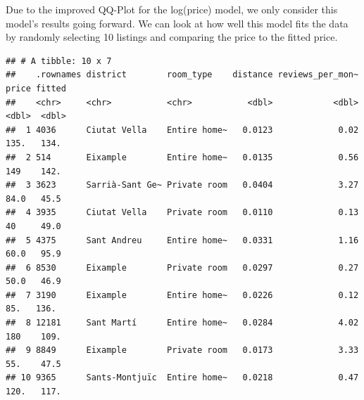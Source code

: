 \documentclass[]{article}
\newenvironment{Shaded}{\begin{snugshade}}{\end{snugshade}}
\newcommand{\DataTypeTok}[1]{\textcolor[rgb]{0.13,0.29,0.53}{#1}}
\newcommand{\DecValTok}[1]{\textcolor[rgb]{0.00,0.00,0.81}{#1}}
\newcommand{\FloatTok}[1]{\textcolor[rgb]{0.00,0.00,0.81}{#1}}
\newcommand{\KeywordTok}[1]{\textcolor[rgb]{0.13,0.29,0.53}{\textbf{#1}}}
\newcommand{\NormalTok}[1]{#1}
\newcommand{\OperatorTok}[1]{\textcolor[rgb]{0.81,0.36,0.00}{\textbf{#1}}}
\newcommand{\OtherTok}[1]{\textcolor[rgb]{0.56,0.35,0.01}{#1}}
\newcommand{\StringTok}[1]{\textcolor[rgb]{0.31,0.60,0.02}{#1}}
\begin{document}
Due to the improved QQ-Plot for the log(price) model, we only consider
this model's results going forward. We can look at how well this model
fits the data by randomly selecting 10 listings and comparing the price
to the fitted price.

\begin{Shaded}
\end{Shaded}

\begin{verbatim}
## # A tibble: 10 x 7
##    .rownames district        room_type    distance reviews_per_mon~ price fitted
##    <chr>     <chr>           <chr>           <dbl>            <dbl> <dbl>  <dbl>
##  1 4036      Ciutat Vella    Entire home~   0.0123             0.02 135.   134. 
##  2 514       Eixample        Entire home~   0.0135             0.56 149    142. 
##  3 3623      Sarrià-Sant Ge~ Private room   0.0404             3.27  84.0   45.5
##  4 3935      Ciutat Vella    Private room   0.0110             0.13  40     49.0
##  5 4375      Sant Andreu     Entire home~   0.0331             1.16  60.0   95.9
##  6 8530      Eixample        Private room   0.0297             0.27  50.0   46.9
##  7 3190      Eixample        Entire home~   0.0226             0.12  85.   136. 
##  8 12181     Sant Martí      Entire home~   0.0284             4.02 180    109. 
##  9 8849      Eixample        Private room   0.0173             3.33  55.    47.5
## 10 9365      Sants-Montjuïc  Entire home~   0.0218             0.47 120.   117.
\end{verbatim}
\end{document}

